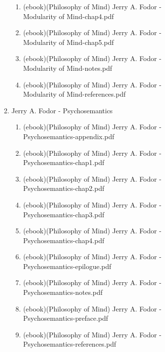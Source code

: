 \documentclass[11pt]{article}
\begin{document}
\begin{enumerate}
\begin{enumerate}
\begin{enumerate}
\begin{enumerate}
\begin{enumerate}
\begin{enumerate}
\begin{enumerate}
\begin{enumerate}
\item (ebook)(Philosophy of Mind) Jerry A. Fodor - Modularity of Mind-chap4.pdf
\label{sec-1-1-1-1-7-3-39-13-32-3-4}

\item (ebook)(Philosophy of Mind) Jerry A. Fodor - Modularity of Mind-chap5.pdf
\label{sec-1-1-1-1-7-3-39-13-32-3-5}

\item (ebook)(Philosophy of Mind) Jerry A. Fodor - Modularity of Mind-notes.pdf
\label{sec-1-1-1-1-7-3-39-13-32-3-6}

\item (ebook)(Philosophy of Mind) Jerry A. Fodor - Modularity of Mind-references.pdf
\label{sec-1-1-1-1-7-3-39-13-32-3-7}
\end{enumerate}

\item Jerry A. Fodor - Psychosemantics
\label{sec-1-1-1-1-7-3-39-13-32-4}
\begin{enumerate}
\item (ebook)(Philosophy of Mind) Jerry A. Fodor - Psychosemantics-appendix.pdf
\label{sec-1-1-1-1-7-3-39-13-32-4-1}

\item (ebook)(Philosophy of Mind) Jerry A. Fodor - Psychosemantics-chap1.pdf
\label{sec-1-1-1-1-7-3-39-13-32-4-2}

\item (ebook)(Philosophy of Mind) Jerry A. Fodor - Psychosemantics-chap2.pdf
\label{sec-1-1-1-1-7-3-39-13-32-4-3}

\item (ebook)(Philosophy of Mind) Jerry A. Fodor - Psychosemantics-chap3.pdf
\label{sec-1-1-1-1-7-3-39-13-32-4-4}

\item (ebook)(Philosophy of Mind) Jerry A. Fodor - Psychosemantics-chap4.pdf
\label{sec-1-1-1-1-7-3-39-13-32-4-5}

\item (ebook)(Philosophy of Mind) Jerry A. Fodor - Psychosemantics-epilogue.pdf
\label{sec-1-1-1-1-7-3-39-13-32-4-6}

\item (ebook)(Philosophy of Mind) Jerry A. Fodor - Psychosemantics-notes.pdf
\label{sec-1-1-1-1-7-3-39-13-32-4-7}

\item (ebook)(Philosophy of Mind) Jerry A. Fodor - Psychosemantics-preface.pdf
\label{sec-1-1-1-1-7-3-39-13-32-4-8}

\item (ebook)(Philosophy of Mind) Jerry A. Fodor - Psychosemantics-references.pdf
\label{sec-1-1-1-1-7-3-39-13-32-4-9}
\end{enumerate}
\end{enumerate}


\end{enumerate}
\end{enumerate}
\end{enumerate}
\end{enumerate}
\end{enumerate}
\end{enumerate}
\end{document}

